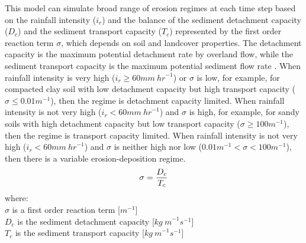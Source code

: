 \documentclass[gmd, manuscript]{copernicus}
\begin{document}
This model can simulate broad range of erosion regimes at each time step
based on the rainfall intensity ($i_r$)
and the balance of the sediment detachment capacity ($D_c$)
and the sediment transport capacity ($T_c$)
represented by the first order reaction term $\sigma$,
which depends on soil and landcover properties.
The detachment capacity is the maximum potential
detachment rate by overland flow, while
the sediment transport capacity
is the maximum potential sediment flow rate
\citep{Mitasova2001}.
When rainfall intensity is very high ($i_r \geq 60 \unit{mm~hr}^{-1}$)
or $\sigma$ is low, for example, for compacted clay soil with low detachment capacity but 
high transport capacity ( $\sigma \leq 0.01 \unit{m}^{-1}$),
then the regime is detachment capacity limited.
%
When rainfall intensity is not very high ($i_r < 60 \unit{mm~hr}^{-1} $)
and $\sigma$ is high, for example, for sandy soils with high detachment capacity but
low transport capacity  ($\sigma \geq 100 \unit{m}^{-1}$),
then the regime is transport capacity limited.
%
When rainfall intensity is not very high
($i_r<60 \unit{mm~hr}^{-1}$)
and $\sigma$ is neither high nor low
($ 0.01 \unit{m}^{-1}< \sigma < 100 \unit{m}^{-1}$),
then there is a variable erosion-deposition regime. \\
\begin{equation}
\label{eq:regime}
\sigma = {D_c \over T_c}
\end{equation}
{\small
\noindent
where: \\
\noindent
\hspace*{0.5em} $\sigma$  is a first order reaction term [$\unit{m}^{-1}$]\\
\hspace*{0.5em} $D_c$ is the sediment detachment capacity [$\unit{kg~m}^{-1}s^{-1}$]\\
\hspace*{0.5em} $T_c$ is the sediment transport capacity [$\unit{kg~m}^{-1}s^{-1}$]\\
}



\end{document}
